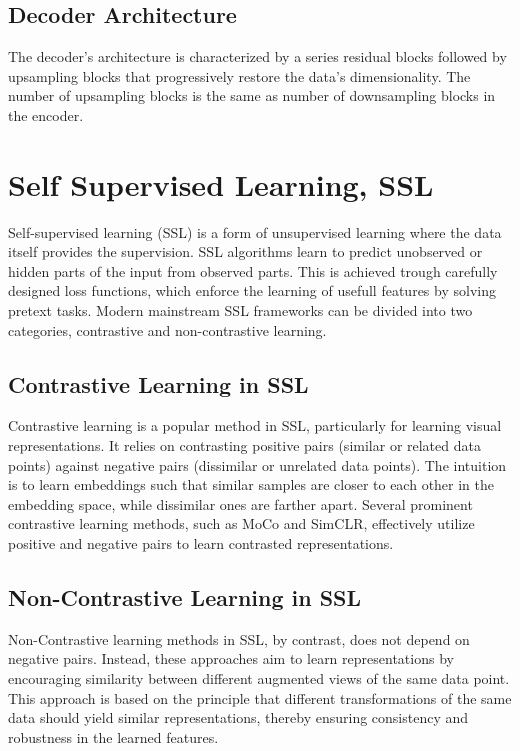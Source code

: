 \subsection{Decoder Architecture}
The decoder's architecture is characterized by a series residual blocks followed by upsampling blocks that progressively restore the data's dimensionality. The number of upsampling blocks is the same as number of downsampling blocks in the encoder. 

\section{Self Supervised Learning, SSL}
Self-supervised learning (SSL) is a form of unsupervised learning where the data itself provides the supervision. SSL algorithms learn to predict unobserved or hidden parts of the input from observed parts.
This is achieved trough carefully designed loss functions, which enforce the learning of usefull features by solving pretext tasks. Modern mainstream SSL frameworks can be divided into two categories, contrastive and non-contrastive learning.

\subsection{Contrastive Learning in SSL}
Contrastive learning is a popular method in SSL, particularly for learning visual representations. It relies on contrasting positive pairs (similar or related data points) against negative pairs (dissimilar or unrelated data points). 
The intuition is to learn embeddings such that similar samples are closer to each other in the embedding space, while dissimilar ones are farther apart.
Several prominent contrastive learning methods, such as MoCo\cite{MoCo} and SimCLR\cite{SimCLR}, effectively utilize positive and negative pairs to learn contrasted representations.

\subsection{Non-Contrastive Learning in SSL}
Non-Contrastive learning methods in SSL, by contrast, does not depend on negative pairs. Instead, these approaches aim to learn representations by encouraging similarity between different augmented views of the same data point. 
This approach is based on the principle that different transformations of the same data should yield similar representations, thereby ensuring consistency and robustness in the learned features.

